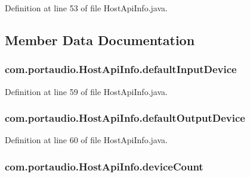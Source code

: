 Definition at line 53 of file Host\+Api\+Info.\+java.



\subsection{Member Data Documentation}
\subsubsection[{\texorpdfstring{default\+Input\+Device}{defaultInputDevice}}]{ com.\+portaudio.\+Host\+Api\+Info.\+default\+Input\+Device}\hypertarget{classcom_1_1portaudio_1_1_host_api_info_a3027205deb4fb9496144ddd59ee5b777}{}\label{classcom_1_1portaudio_1_1_host_api_info_a3027205deb4fb9496144ddd59ee5b777}


Definition at line 59 of file Host\+Api\+Info.\+java.

\subsubsection[{\texorpdfstring{default\+Output\+Device}{defaultOutputDevice}}]{ com.\+portaudio.\+Host\+Api\+Info.\+default\+Output\+Device}\hypertarget{classcom_1_1portaudio_1_1_host_api_info_a2cd75a584de461099ad6f1bbcb620216}{}\label{classcom_1_1portaudio_1_1_host_api_info_a2cd75a584de461099ad6f1bbcb620216}


Definition at line 60 of file Host\+Api\+Info.\+java.

\subsubsection[{\texorpdfstring{device\+Count}{deviceCount}}]{ com.\+portaudio.\+Host\+Api\+Info.\+device\+Count}\hypertarget{classcom_1_1portaudio_1_1_host_api_info_a81c1f3b0678e3f6820ae9a4b77f55a13}{}\label{classcom_1_1portaudio_1_1_host_api_info_a81c1f3b0678e3f6820ae9a4b77f55a13}


